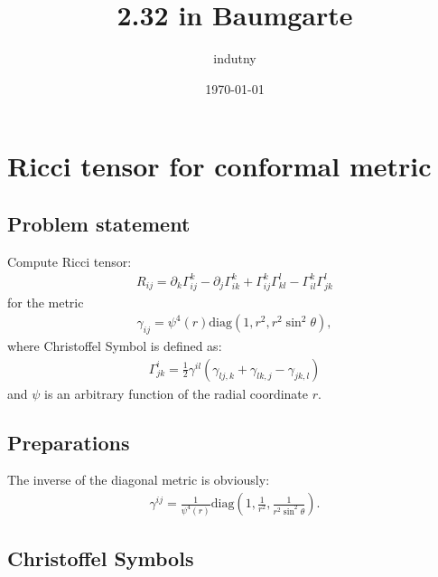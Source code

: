 \documentclass[aps,prd,preprint]{revtex4-1}
\begin{document}
\title{2.32 in Baumgarte}
\author{indutny}
\date{\today}
\noaffiliation

\maketitle

\section{Ricci tensor for conformal metric}

\subsection{Problem statement}

Compute Ricci tensor:
\begin{align}\label{eq:ricci}
R_{ij} = \partial_k \Gamma^k_{ij} - \partial_j \Gamma^k_{ik} + \Gamma^k_{ij} \Gamma^l_{kl} -
  \Gamma^k_{il} \Gamma^l_{jk}
\end{align}
for the metric
\begin{align}
\gamma_{ij} = \psi^4(r) \text{diag} \left(1, r^2, r^2 \sin^2 \theta \right),
\end{align}
where Christoffel Symbol is defined as:
\begin{align}\label{eq:cristoffel}
\Gamma^i_{jk} = \frac{1}{2} \gamma^{il} \left( \gamma_{lj,k} + \gamma_{lk,j} - \gamma_{jk,l} \right)
\end{align}
and $\psi$ is an arbitrary function of the radial coordinate $r$.

\subsection{Preparations}

The inverse of the diagonal metric is obviously:
\begin{align}
\gamma^{ij} = \frac{1}{\psi^4(r)} \text{diag} \left(1, \frac{1}{r^2}, \frac{1}{r^2 \sin^2 \theta} \right).
\end{align}

\subsection{Christoffel Symbols}
\end{document}
